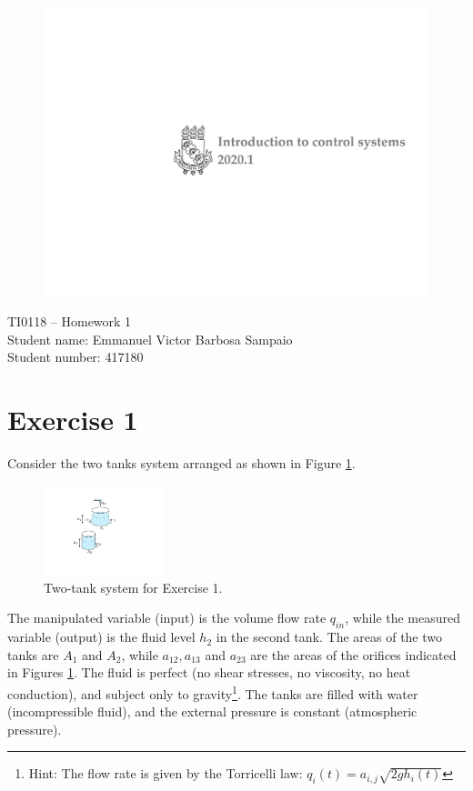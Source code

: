 \documentclass[a4paper,11pt]{article}
\begin{document}
\begin{figure}[!h] \includegraphics [scale=0.35] {Figures/FromMichela/Course-logo-long} \end{figure}

\begin{spacing}{1.5}
{\Large\sc \noindent TI0118 -- Homework 1} \\

{\large\sc \noindent Student name: Emmanuel Victor Barbosa Sampaio}\\
{\large\sc \noindent Student number: 417180 }
\end{spacing}
\vskip1cm
\section*{Exercise 1}
Consider the two tanks system arranged as shown in Figure \ref{fig:ex1}.
\begin{figure}[H]
\begin{center}\includegraphics[width=0.31\textwidth]{Figures/FromMichela/tanks_ex} \end{center}
 \vskip-0.5cm\caption{Two-tank system for Exercise 1.}
\label{fig:ex1}
\end{figure}
\noindent The manipulated variable (input) is the volume flow rate $q_{in}$, while the measured variable (output) is the fluid level $h_2$ in the second tank.
 The areas of the two tanks are  $A_1$ and $A_2$, while $a_{12}, a_{13}$ and $a_{23}$ are the areas of the orifices indicated in Figures \ref{fig:ex1}. The fluid is perfect (no shear stresses, no viscosity, no heat conduction), and subject only to gravity\footnote{Hint: The flow rate is given by the Torricelli law: $q_i(t)=a_{i,j}\sqrt{2gh_i(t)}$}. The tanks are filled with water (incompressible fluid), and the external pressure is constant (atmospheric pressure).
\end{document}
